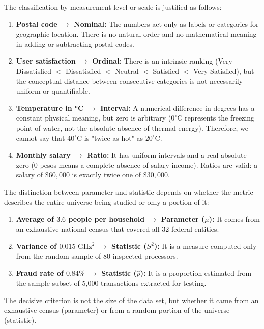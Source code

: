 \begin{solproblema}
	The classification by measurement level or scale is justified as follows:
	\begin{enumerate}
		\item \textbf{Postal code $\to$ Nominal:} The numbers act only as labels or categories for geographic location. There is no natural order and no mathematical meaning in adding or subtracting postal codes.
		\item \textbf{User satisfaction $\to$ Ordinal:} There is an intrinsic ranking (Very Dissatisfied $<$ Dissatisfied $<$ Neutral $<$ Satisfied $<$ Very Satisfied), but the conceptual distance between consecutive categories is not necessarily uniform or quantifiable.
		\item \textbf{Temperature in °C $\to$ Interval:} A numerical difference in degrees has a constant physical meaning, but zero is arbitrary ($0^\circ\text{C}$ represents the freezing point of water, not the absolute absence of thermal energy). Therefore, we cannot say that $40^\circ\text{C}$ is "twice as hot" as $20^\circ\text{C}$.
		\item \textbf{Monthly salary $\to$ Ratio:} It has uniform intervals and a real absolute zero ($0$ pesos means a complete absence of salary income). Ratios are valid: a salary of $\$60,000$ is exactly twice one of $\$30,000$.
	\end{enumerate}
\end{solproblema}

\begin{solproblema}[prob:7b7dc88]
	The distinction between parameter and statistic depends on whether the metric describes the entire universe being studied or only a portion of it:
	\begin{enumerate}
		\item \textbf{Average of $3.6$ people per household $\to$ Parameter ($\mu$):} It comes from an exhaustive national census that covered all 32 federal entities.
		\item \textbf{Variance of $0.015 \text{ GHz}^2$ $\to$ Statistic ($S^2$):} It is a measure computed only from the random sample of 80 inspected processors.
		\item \textbf{Fraud rate of $0.84\%$ $\to$ Statistic ($\hat{p}$):} It is a proportion estimated from the sample subset of 5,000 transactions extracted for testing.
	\end{enumerate}
	The decisive criterion is not the size of the data set, but whether it came from an exhaustive census (parameter) or from a random portion of the universe (statistic).
\end{solproblema}


